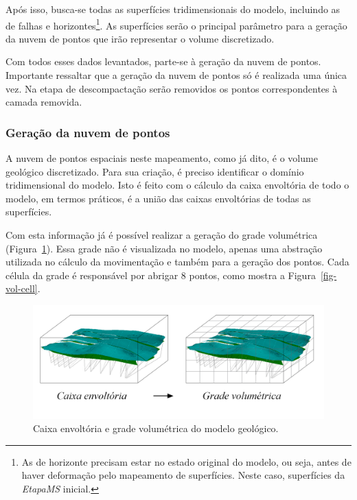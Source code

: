 Após isso, busca-se todas as superfícies tridimensionais do modelo, incluindo as de falhas e horizontes\footnote{As de horizonte precisam estar no estado original do modelo, ou seja, antes de haver deformação pelo mapeamento de superfícies. Neste caso, superfícies da \emph{EtapaMS} inicial.}. As superfícies serão o principal parâmetro para a geração da nuvem de pontos que irão representar o volume discretizado.

Com todos esses dados levantados, parte-se à geração da nuvem de pontos. Importante ressaltar que a geração da nuvem de pontos só é realizada uma única vez. Na etapa de descompactação serão removidos os pontos correspondentes à camada removida.

\subsubsection{Geração da nuvem de pontos} 

A nuvem de pontos espaciais neste mapeamento, como já dito, é o volume geológico discretizado. Para sua criação, é preciso identificar o domínio tridimensional do modelo. Isto é feito com o cálculo da caixa envoltória de todo o modelo, em termos práticos, é a união das caixas envoltórias de todas as superfícies.

Com esta informação já é possível realizar a geração do grade volumétrica (Figura~\ref{fig-vol-grid}). Essa grade não é visualizada no modelo, apenas uma abstração utilizada no cálculo da movimentação e também para a geração dos pontos. Cada célula da grade é responsável por abrigar 8 pontos, como mostra a Figura~\ref{fig-vol-cell}.

\begin{figure} [H]
  \begin{center}
    \includegraphics[width=\textwidth]{images/fig-vol-grid}
    \caption{Caixa envoltória e grade volumétrica do modelo geológico.}\label{fig-vol-grid}
  \end{center}
\end{figure}

